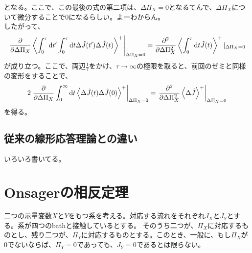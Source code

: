 \documentclass[a4paper,11pt]{jsarticle}
\begin{document}
となる。ここで、この最後の式の第二項は、$\Delta \Pi_X=0$となるてんで、$\Delta \Pi_X$について微分することで0になるらしい。よーわからん。\\
したがって、
\begin{align} 
    \left.\pdv{\Delta \Pi_X} \ev{\int_0 ^{\tau} \dd t' \int_0 ^{\tau} \dd t \Delta \hat{J}(t')\Delta \hat{J}(t)}^+\right|_{\Delta \Pi_X = 0} = \pdv[2]{\Delta \Pi_X} \ev{\int_0 ^{\tau} \dd t \hat{J}(t)}^+|_{\Delta \Pi_X = 0}
\end{align}
が成り立つ。ここで、両辺$\frac{1}{\tau}$をかけ、$\tau \to \infty$の極限を取ると、前回のゼミと同様の変形をすることで、
\begin{align}
    2\left.\pdv{\Delta \Pi_X} \int_0 ^{\infty} \dd t \ev{\Delta \hat{J}(t) \Delta \hat{J}(0)}^+\right|_{\Delta \Pi_X = 0} = \left.\pdv[2]{\Delta \Pi_X} \ev{\Delta \hat{J}}^+\right|_{\Delta \Pi_X = 0}
\end{align}
を得る。\hfill \qedsymbol

\subsection{従来の線形応答理論との違い}
いろいろ書いてる。\\

\section{Onsagerの相反定理}
二つの示量変数$X$と$Y$をもつ系を考える。対応する流れをそれぞれ$J_X$と$J_Y$とする。系が四つのbathと接触しているとする。
そのうち二つが、$\Pi_X$に対応するものとし、残り二つが、$\Pi_Y$に対応するものとする。このとき、一般に、もし$\Pi_X$が$0$でないならば、$\Pi_Y=0$であっても、$J_Y=0$であるとは限らない。\\
\end{document}
